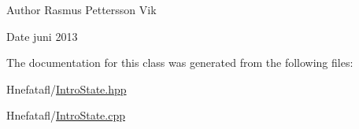 \begin{DoxyAuthor}{Author}
Rasmus Pettersson Vik 
\end{DoxyAuthor}
\begin{DoxyDate}{Date}
juni 2013 
\end{DoxyDate}


The documentation for this class was generated from the following files\-:\begin{DoxyCompactItemize}
\item 
Hnefatafl/\hyperlink{_intro_state_8hpp}{Intro\-State.\-hpp}\item 
Hnefatafl/\hyperlink{_intro_state_8cpp}{Intro\-State.\-cpp}\end{DoxyCompactItemize}
